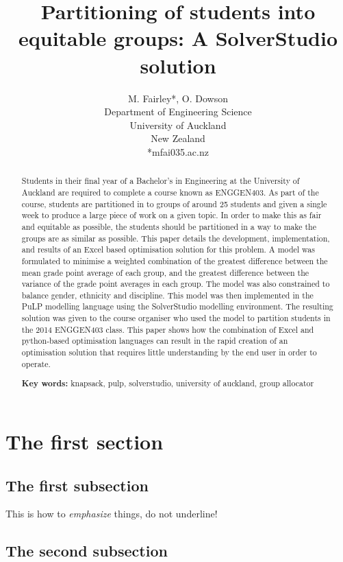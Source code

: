 \documentclass[12pt]{ORSNZ}
\title{Partitioning of students into equitable groups: A SolverStudio solution}
\author{M. Fairley*, O. Dowson\\Department of Engineering Science\\University of
  Auckland\\New Zealand\\{*}mfai035\@@aucklanduni.ac.nz}
\date{} %
\begin{document}
\maketitle
\pagestyle{empty} \thispagestyle{empty}
\begin{abstract}
Students in their final year of a Bachelor’s in Engineering at the University of Auckland are required to complete a course known as ENGGEN403. As part of the course, students are partitioned in to groups of around 25 students and given a single week to produce a large piece of work on a given topic. In order to make this as fair and equitable as possible, the students should be partitioned in a way to make the groups are as similar as possible. This paper details the development, implementation, and results of an Excel based optimisation solution for this problem. A model was formulated to minimise a weighted combination of the greatest difference between the mean grade point average of each group, and the greatest difference between the variance of the grade point averages in each group. The model was also constrained to balance gender, ethnicity and discipline. This model was then implemented in the PuLP modelling language using the SolverStudio modelling environment. The resulting solution was given to the course organiser who used the model to partition students in the 2014 ENGGEN403 class. This paper shows how the combination of Excel and python-based optimisation languages can result in the rapid creation of an optimisation solution that requires little understanding by the end user in order to operate.

\textbf{Key words:} knapsack, pulp, solverstudio, university of auckland, group allocator
\end{abstract}

\section{The first section}

\subsection{The first subsection}

This is how to \emph{emphasize} things, do not underline!


\subsection{The second subsection}
\end{document}
